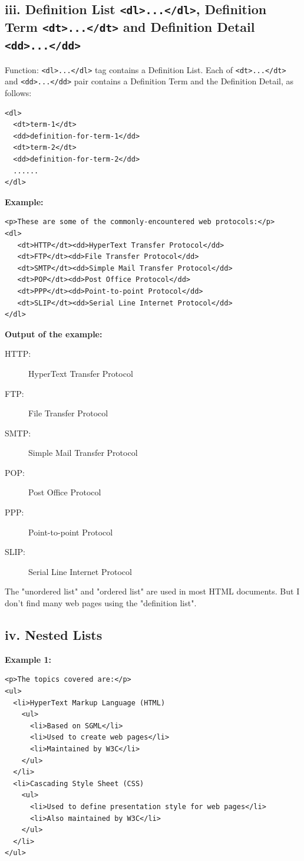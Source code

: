 \documentclass[12pt,a4paper]{article}
\begin{document}
\subsection*{iii. Definition List \texttt{<dl>...</dl>}, Definition Term \texttt{<dt>...</dt>} and Definition Detail \texttt{<dd>...</dd>}}
Function: \texttt{<dl>...</dl>} tag contains a Definition List. Each of \texttt{<dt>...</dt>} and \texttt{<dd>...</dd>} pair contains a Definition Term and the Definition Detail, as follows:

\begin{verbatim}
<dl>
  <dt>term-1</dt>
  <dd>definition-for-term-1</dd>
  <dt>term-2</dt>
  <dd>definition-for-term-2</dd>
  ......
</dl>
\end{verbatim}

\textbf{Example:}
\begin{verbatim}
<p>These are some of the commonly-encountered web protocols:</p>
<dl>
   <dt>HTTP</dt><dd>HyperText Transfer Protocol</dd>
   <dt>FTP</dt><dd>File Transfer Protocol</dd>
   <dt>SMTP</dt><dd>Simple Mail Transfer Protocol</dd>
   <dt>POP</dt><dd>Post Office Protocol</dd>
   <dt>PPP</dt><dd>Point-to-point Protocol</dd>
   <dt>SLIP</dt><dd>Serial Line Internet Protocol</dd>
</dl>
\end{verbatim}

\textbf{Output of the example:}
\begin{description}
    \item[HTTP:] HyperText Transfer Protocol
    \item[FTP:] File Transfer Protocol
    \item[SMTP:] Simple Mail Transfer Protocol
    \item[POP:] Post Office Protocol
    \item[PPP:] Point-to-point Protocol
    \item[SLIP:] Serial Line Internet Protocol
\end{description}

The "unordered list" and "ordered list" are used in most HTML documents. But I don't find many web pages using the "definition list".

\subsection*{iv. Nested Lists}
\textbf{Example 1:}
\begin{verbatim}
<p>The topics covered are:</p>
<ul>
  <li>HyperText Markup Language (HTML)
    <ul>
      <li>Based on SGML</li>
      <li>Used to create web pages</li>
      <li>Maintained by W3C</li>
    </ul>
  </li>
  <li>Cascading Style Sheet (CSS)
    <ul>
      <li>Used to define presentation style for web pages</li>
      <li>Also maintained by W3C</li>
    </ul>
  </li>
</ul>
\end{verbatim}
\end{document}
